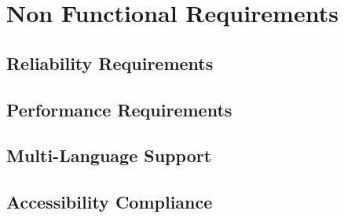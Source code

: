 \section{Non Functional Requirements}

\subsection{Reliability Requirements}
\subsection{Performance Requirements}

\subsection{Multi-Language Support}




\subsection{Accessibility Compliance}






